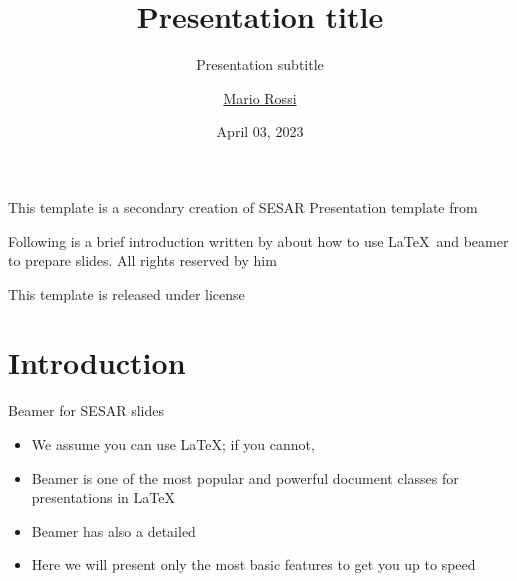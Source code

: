\documentclass{beamer}
\title{Presentation title}
\subtitle{Presentation subtitle}
\author{\href{mailto:mariorossi@example.com}{Mario Rossi}}
\date{April 03, 2023}
\begin{document}
\maketitle

\begin{frame}

	This template is a secondary creation of SESAR Presentation template from  \vspace{\baselineskip}

	Following is a brief introduction written by  about how to use \LaTeX\ and beamer to prepare slides. All rights reserved by him\vspace{\baselineskip}

	This template is released under  license

\end{frame}

\section{Introduction}

\begin{frame}{Beamer for SESAR slides}{\thesection \, \secname}

	\begin{itemize}
		\item We assume you can use \LaTeX; if you cannot,
		\item Beamer is one of the most popular and powerful document
		      classes for presentations in \LaTeX
		\item Beamer has also a detailed
		\item Here we will present only the most basic features to get you up to speed
	\end{itemize}
\end{frame}
\end{document}
